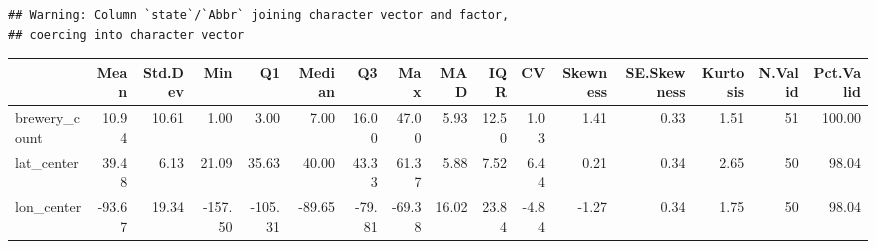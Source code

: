 \documentclass[]{article}
\newenvironment{Shaded}{\begin{snugshade}}{\end{snugshade}}
\newcommand{\KeywordTok}[1]{\textcolor[rgb]{0.13,0.29,0.53}{\textbf{#1}}}
\newcommand{\DataTypeTok}[1]{\textcolor[rgb]{0.13,0.29,0.53}{#1}}
\newcommand{\DecValTok}[1]{\textcolor[rgb]{0.00,0.00,0.81}{#1}}
\newcommand{\CommentTok}[1]{\textcolor[rgb]{0.56,0.35,0.01}{\textit{#1}}}
\newcommand{\OtherTok}[1]{\textcolor[rgb]{0.56,0.35,0.01}{#1}}
\newcommand{\OperatorTok}[1]{\textcolor[rgb]{0.81,0.36,0.00}{\textbf{#1}}}
\newcommand{\NormalTok}[1]{#1}
\begin{document}
\begin{verbatim}
## Warning: Column `state`/`Abbr` joining character vector and factor,
## coercing into character vector
\end{verbatim}

\begin{Shaded}
\end{Shaded}

\begin{longtable}[]{@{}lrrrrrrrrrrrrrrr@{}}
\toprule
& Mean & Std.Dev & Min & Q1 & Median & Q3 & Max & MAD & IQR & CV &
Skewness & SE.Skewness & Kurtosis & N.Valid & Pct.Valid\tabularnewline
\midrule
\endhead
brewery\_count & 10.94 & 10.61 & 1.00 & 3.00 & 7.00 & 16.00 & 47.00 &
5.93 & 12.50 & 1.03 & 1.41 & 0.33 & 1.51 & 51 & 100.00\tabularnewline
lat\_center & 39.48 & 6.13 & 21.09 & 35.63 & 40.00 & 43.33 & 61.37 &
5.88 & 7.52 & 6.44 & 0.21 & 0.34 & 2.65 & 50 & 98.04\tabularnewline
lon\_center & -93.67 & 19.34 & -157.50 & -105.31 & -89.65 & -79.81 &
-69.38 & 16.02 & 23.84 & -4.84 & -1.27 & 0.34 & 1.75 & 50 &
98.04\tabularnewline
\bottomrule
\end{longtable}
\end{document}
